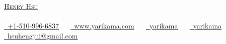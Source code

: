\begin{center}
  {\Huge \scshape \href{https://www.yarikama.com/}{{Henry Hsu}}} \\
  {\small\color{gray} \mylocation} \\
  \href{tel:+1-510-996-6837}{\raisebox{-0.2\height}\faPhone\  \underline{+1-510-996-6837}} ~~
  \href{https://www.yarikama.com/}{\raisebox{-0.2\height}\faGlobe\ \underline{www.yarikama.com}} ~~
  \href{https://www.linkedin.com/in/yarikama/}{\raisebox{-0.2\height}\faLinkedin\ \underline{yarikama}}  ~~
  \href{https://www.github.com/yarikama}{\raisebox{-0.2\height}\faGithub\ \underline{yarikama}} ~~
  \href{mailto:hsuhengjui@gmail.com}{\raisebox{-0.2\height}\faEnvelope\  \underline{hsuhengjui@gmail.com}} ~~
\end{center}
\vspace{\resumeHeaderGap}%
